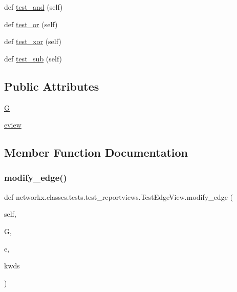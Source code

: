 \begin{DoxyCompactItemize}
\item 
def \hyperlink{classnetworkx_1_1classes_1_1tests_1_1test__reportviews_1_1TestEdgeView_a97d4f7954bef3de4920e40596db4957f}{test\+\_\+and} (self)
\item 
def \hyperlink{classnetworkx_1_1classes_1_1tests_1_1test__reportviews_1_1TestEdgeView_af4ed359e41ca796c486bb45fc94acbf0}{test\+\_\+or} (self)
\item 
def \hyperlink{classnetworkx_1_1classes_1_1tests_1_1test__reportviews_1_1TestEdgeView_a641463c0dd5de73866541c04b02c5cc7}{test\+\_\+xor} (self)
\item 
def \hyperlink{classnetworkx_1_1classes_1_1tests_1_1test__reportviews_1_1TestEdgeView_a997b5b9e3b0cff6daa05a7af3e1c4eb5}{test\+\_\+sub} (self)
\end{DoxyCompactItemize}
\subsection*{Public Attributes}
\begin{DoxyCompactItemize}
\item 
\hyperlink{classnetworkx_1_1classes_1_1tests_1_1test__reportviews_1_1TestEdgeView_aeada35ed82e4fd893cfcf31f8cf4c0bb}{G}
\item 
\hyperlink{classnetworkx_1_1classes_1_1tests_1_1test__reportviews_1_1TestEdgeView_aed4a1078deae32395550d751e86e33c9}{eview}
\end{DoxyCompactItemize}


\subsection{Member Function Documentation}
\mbox{\label{classnetworkx_1_1classes_1_1tests_1_1test__reportviews_1_1TestEdgeView_ac4d699032bd20df7a61d71ca7804d081}} 
\subsubsection{\texorpdfstring{modify\+\_\+edge()}{modify\_edge()}}
{\footnotesize\ttfamily def networkx.\+classes.\+tests.\+test\+\_\+reportviews.\+Test\+Edge\+View.\+modify\+\_\+edge (\begin{DoxyParamCaption}\item[{}]{self,  }\item[{}]{G,  }\item[{}]{e,  }\item[{}]{kwds }\end{DoxyParamCaption})}


